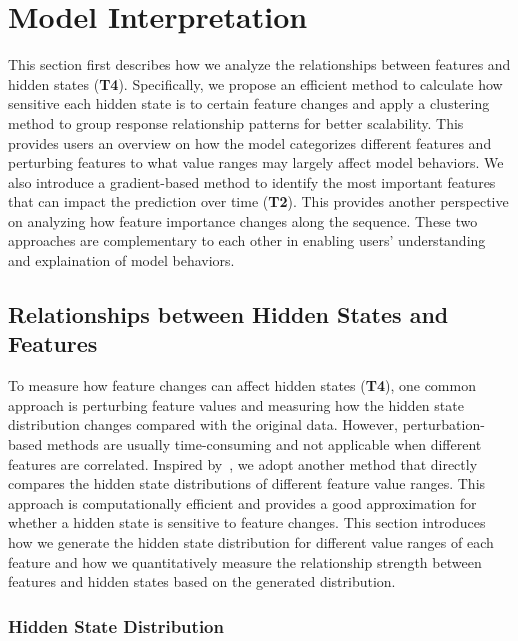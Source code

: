 \section{Model Interpretation}
This section first describes how we analyze the relationships between features and hidden states (\textbf{T4}).
Specifically, we propose an efficient method to calculate how sensitive each hidden state is to certain feature changes and apply a clustering method to group response relationship patterns for better scalability.
This provides users an overview on how the model categorizes different features and perturbing features to what value ranges may largely affect model behaviors.
We also introduce a gradient-based method to identify the most important features that can impact the prediction over time (\textbf{T2}).
This provides another perspective on analyzing how feature importance changes along the sequence.
These two approaches are complementary to each other in enabling users'  understanding and explaination of model behaviors.

\subsection{Relationships between Hidden States and Features}

To measure how feature changes can affect hidden states (\textbf{T4}), one common approach is perturbing feature values and measuring how the hidden state distribution changes compared with the original data.
However, perturbation-based methods are usually time-consuming and not applicable when different features are correlated.
Inspired by~\cite{sun2015deeply}, we adopt another method that directly compares the hidden state distributions of different feature value ranges.
This approach is computationally efficient and provides a good approximation for whether a hidden state is sensitive to feature changes.
This section introduces how we generate the hidden state distribution for different value ranges of each feature and how we quantitatively measure the relationship strength between features and hidden states based on the generated distribution.

\subsubsection{Hidden State Distribution}
\label{section:response_and_activation}


